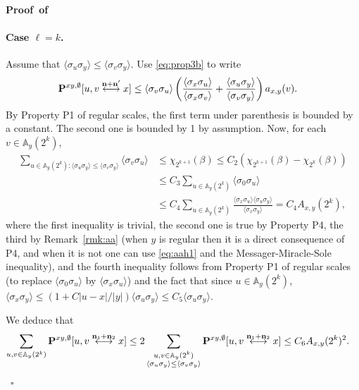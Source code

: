 \documentclass[a4paper,oneside,11pt]{article}
\numberwithin{equation}{section}
\numberwithin{equation}{section}
\numberwithin{equation}{section}
\newenvironment{proof}[1][\relax]%
  {\paragraph{Proof\ifx#1\relax\else~of #1\fi}}%
  {~\hfill$\square$\par\bigskip}
\newcommand{\bbA}{\mathbb{A}}
\newcommand{\n}{\mathbf{n}}
\begin{document}
\begin{proof}
\paragraph{Case $\ell=k$.} Assume that $\langle\sigma_u\sigma_y\rangle\le \langle\sigma_v\sigma_y\rangle$. Use \eqref{eq:prop3b} to write
\begin{align}
\label{eq:dt}{\bf P}^{xy,\emptyset}[u,v\stackrel{\n+\n'}\longleftrightarrow x]&\le\langle\sigma_v\sigma_u\rangle\left(\frac{\langle\sigma_x\sigma_u\rangle}{\langle\sigma_x\sigma_v\rangle}+\frac{\langle\sigma_u\sigma_y\rangle}{\langle\sigma_v\sigma_y\rangle}\right) a_{x,y}(v).
\end{align}
By Property P1 of regular scales, the first term under parenthesis is bounded by a constant. The second one is bounded by 1 by assumption. Now, for each $v\in \bbA_{y}(2^k)$, 
 \begin{align*}
\sum_{u\in \bbA_{y}(2^k):\langle\sigma_u\sigma_y\rangle\le \langle\sigma_v\sigma_y\rangle}\langle\sigma_v\sigma_u\rangle&\le \chi_{2^{k+1}}(\beta)\le C_2(\chi_{2^{k+1}}(\beta)-\chi_{2^k}(\beta))\\
& \le  C_3\sum_{u\in \bbA_{y}(2^k)}\langle\sigma_0\sigma_u\rangle \\
&\le C_4\sum_{u\in \bbA_{y}(2^k)}\frac{\langle\sigma_x\sigma_u\rangle\langle\sigma_u\sigma_y\rangle}{\langle\sigma_x\sigma_y\rangle}=C_4A_{x,y}(2^k),
\end{align*}
where the first inequality is trivial, the second one is true by Property P4, the third by Remark~\ref{rmk:aa} (when $y$ is regular then it is a direct consequence of P4, and when it is not one can use \eqref{eq:aah1} and the Messager-Miracle-Sole inequality), and the fourth inequality follows from Property P1 of regular scales (to replace $\langle\sigma_0\sigma_u\rangle$ by $\langle\sigma_x\sigma_u\rangle$) and the fact that since $u\in \bbA_y(2^k)$,  $\langle\sigma_x\sigma_y\rangle\le (1+C|u-x|/|y|)\langle\sigma_u\sigma_y\rangle\le C_5\langle\sigma_u\sigma_y\rangle$. 

We deduce that 
\begin{align}\label{eq:b3}\sum_{u,v\in\bbA_{y}(2^k)}{\bf P}^{xy,\emptyset}[u,v\stackrel{\n_1+\n_2}\longleftrightarrow x]\le 2\sum_{\substack{u,v\in\bbA_{y}(2^k)\\
\langle\sigma_u\sigma_y\rangle\le \langle\sigma_v\sigma_y\rangle}}{\bf P}^{xy,\emptyset}[u,v\stackrel{\n_1+\n_2}\longleftrightarrow x]&\le  C_6A_{x,y}(2^k)^2.\end{align}
\end{proof}
\end{document}
